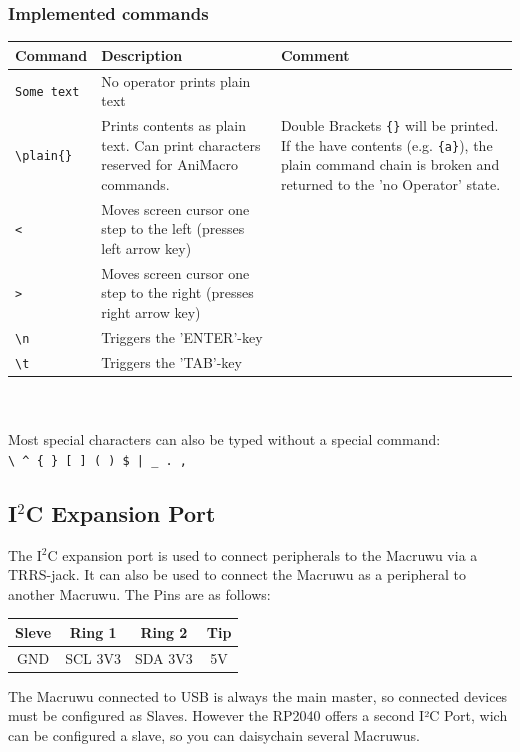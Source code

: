 \documentclass[english, 12pt]{scrartcl}
\begin{document}
	\subsubsection{Implemented commands}
	\begin{tabular}{|l|m{6.5cm}|m{6.5cm}}
		\hline
		\textbf{Command} & \textbf{Description} & \textbf{Comment}\\
		\hline
		\hline
		\verb=Some text= & No operator prints plain text& \\
		\hline
		\verb=\plain{}= & Prints contents as plain text. Can print characters reserved for AniMacro commands. & Double Brackets \verb={}= will be printed. If the have contents (e.g. \verb={a}=), the plain command chain is broken and returned to the 'no Operator' state.\\
		\hline 
		\verb=<= & Moves screen cursor one step to the left (presses left arrow key) & \\
		\verb=>= & Moves screen cursor one step to the right (presses right arrow key) & \\
		\verb=\n= & Triggers the 'ENTER'-key & \\
		\verb=\t= & Triggers the 'TAB'-key & \\
		\hline
	\end{tabular}\\\\
	Most special characters can also be typed without a special command:\\
	\verb=\ ^ { } [ ] ( ) $ | _ . ,=
	
	\subsection{I$^2$C Expansion Port}
	\noindent
	The I$^2$C expansion port is used to connect peripherals to the Macruwu via a TRRS-jack. It can also be used to connect the Macruwu as a peripheral to another Macruwu. The Pins are as follows:
	\begin{center}
		\begin{tabular}{|c|c|c|c|}
			\hline
			Sleve&Ring 1& Ring 2& Tip\\
			\hline
			GND & SCL 3V3 & SDA 3V3 & 5V\\
			\hline
		\end{tabular}
	\end{center}
	The Macruwu connected to USB is always the main master, so connected devices must be configured as Slaves. However the RP2040 offers a second I²C Port, wich can be configured a slave, so you can daisychain several Macruwus.
\end{document}
